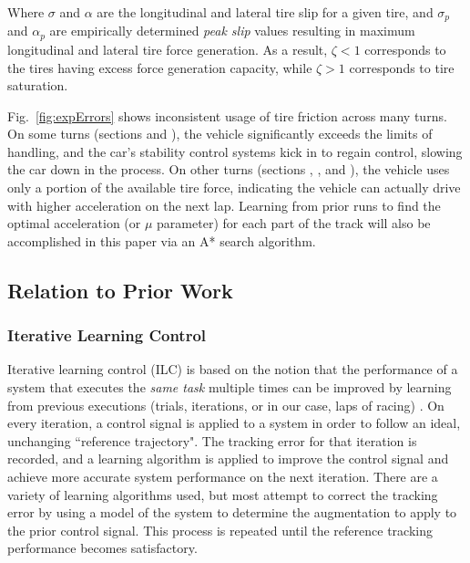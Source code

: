 \documentclass[9pt,shortpaper,twoside,web]{ieeecolor}
\newcommand*\circled[1]{\tikz[baseline=(char.base)]{
            \node[shape=circle,draw,inner sep=2pt] (char) {#1};}}
\begin{document}
Where $\sigma$ and $\alpha$ are the longitudinal and lateral tire slip for a given tire, and $\sigma_p$ and $\alpha_p$ are empirically
determined \textit{peak slip} values resulting in maximum longitudinal and lateral tire force generation. As a result, $\zeta < 1 $ corresponds to the tires having excess force generation capacity, while $\zeta > 1$ corresponds to tire saturation. 

Fig.~\ref{fig:expErrors} shows inconsistent usage of tire friction across many turns. On some turns (sections \circled{2} and \circled{8}), the vehicle significantly exceeds the limits of handling, and the car's stability control systems kick in to regain control, slowing the car down in the process. On other turns (sections \circled{3}, \circled{5}, and \circled{7}),
the vehicle uses only a portion of the available tire force, indicating the vehicle can actually drive with higher acceleration on the next lap. Learning from prior runs to find the optimal acceleration (or $\mu$ parameter) for each part of the track will also be accomplished in this paper via an A* search algorithm. 

\subsection{Relation to Prior Work}
\subsubsection{Iterative Learning Control}

Iterative learning control (ILC) is based on the notion that the performance of a system that executes the \textit{same task} multiple times can be improved by learning from previous executions (trials, iterations, or in our case, laps of racing) \cite{bristow}.
On every iteration, a control signal is applied to a system in order to follow an ideal, unchanging ``reference trajectory". 
The tracking error for that iteration is recorded, and a learning algorithm is applied to improve the control signal and achieve
more accurate system performance on the next iteration. There are a variety of learning algorithms used, but most attempt to correct the tracking error by using a model of the system to determine the augmentation to apply to the prior control signal. This process is repeated until the reference tracking performance becomes satisfactory.
\end{document}
